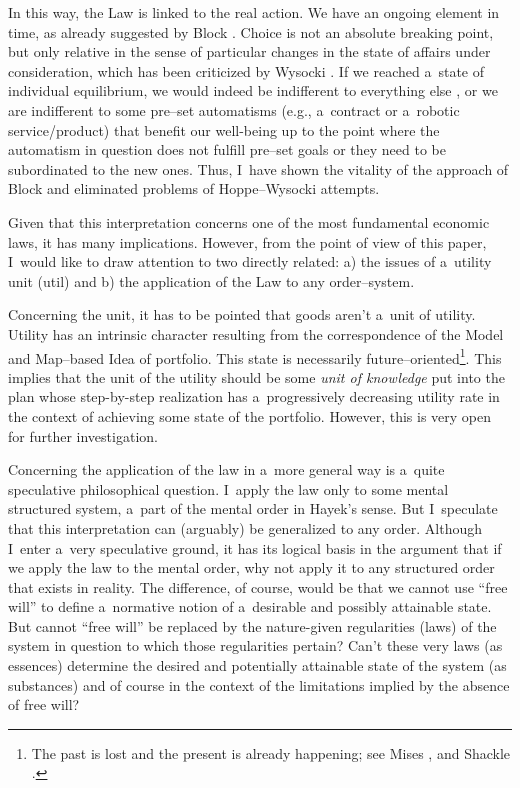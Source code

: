 In this way, the Law is linked to the real action. We have an ongoing element in time, as already suggested by Block 
\parencites*[][]{}[][]{}. %
 Choice is not an absolute breaking point, but only relative in the sense of particular changes in the state of affairs under consideration, which has been criticized by Wysocki 
\parencite*[][]{}. %
 If we reached a~state of individual equilibrium, we would indeed be indifferent to everything else 
\parencite[][]{}, %
 or we are indifferent to some pre–set automatisms (e.g., a~contract or a~robotic service/product) that benefit our well-being up to the point where the automatism in question does not fulfill pre–set goals or they need to be subordinated to the new ones. Thus, I~have shown the vitality of the approach of Block 
\parencite*[][]{} %
 and eliminated problems of Hoppe–Wysocki attempts.



Given that this interpretation concerns one of the most fundamental economic laws, it has many implications. However, from the point of view of this paper, I~would like to draw attention to two directly related: a) the issues of a~utility unit (util) and b) the application of the Law to any order–system.



Concerning the unit, it has to be pointed that goods aren't a~unit of utility. Utility has an intrinsic character resulting from the correspondence of the Model and Map–based Idea of portfolio. This state is necessarily future–oriented\footnote{The past is lost and the present is already happening; see Mises 
\parencite*[][]{}, %
 and Shackle 
\parencite*[][]{}.%
}. This implies that the unit of the utility should be some \textit{unit of knowledge} put into the plan whose step-by-step realization has a~progressively decreasing utility rate in the context of achieving some state of the portfolio. However, this is very open for further investigation.



Concerning the application of the law in a~more general way is a~quite speculative philosophical question. I~apply the law only to some mental structured system, a~part of the mental order in Hayek's sense. But I~speculate that this interpretation can (arguably) be generalized to any order. Although I~enter a~very speculative ground, it has its logical basis in the argument that if we apply the law to the mental order, why not apply it to any structured order that exists in reality. The difference, of course, would be that we cannot use ``free will'' to define a~normative notion of a~desirable and possibly attainable state. But cannot ``free will'' be replaced by the nature-given regularities (laws) of the system in question to which those regularities pertain? Can't these very laws (as essences) determine the desired and potentially attainable state of the system (as substances) and of course in the context of the limitations implied by the absence of free will?



